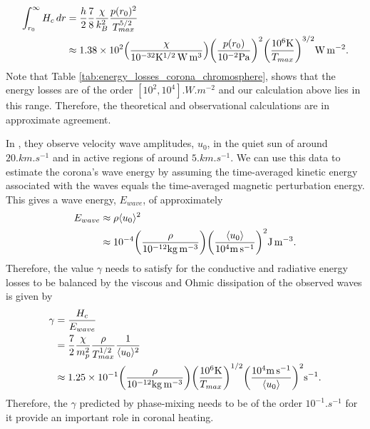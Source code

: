 \begin{equation}
    \begin{aligned}
    \int_{r_0}^\infty H_c \, dr &= \frac{h}{2}\frac{7}{8}\frac{\chi}{k_B^2}\frac{p(r_0)^2}{T_{max}^{5/2}} \\
    &\approx 1.38\times10^{2}\qty(\frac{\chi}{10^{-32}\si{.K^{1/2}.W.m^3}})\qty(\frac{p(r_0)}{10^{-2}\si{.Pa}})^2\qty(\frac{10^6\si{.K}}{T_{max}})^{3/2}\si{.W.m^{-2}}.
    \end{aligned}
\end{equation}
Note that Table \ref{tab:energy_losses_corona_chromosphere}, shows that the energy losses are of the order $[10^2,10^4]\si{.W.m^{-2}}$ and our calculation above lies in this range. Therefore, the theoretical and observational calculations are in approximate agreement. 

In \citet{McIntosh2011,McIntosh2012}, they observe velocity wave amplitudes, $u_0$, in the quiet sun of around $20\si{.km.s^{-1}}$ and in active regions of around $5\si{.km.s^{-1}}$. We can use this data to estimate the corona's wave energy by assuming the time-averaged kinetic energy associated with the waves equals the time-averaged magnetic perturbation energy. This gives a wave energy, $E_{wave}$, of approximately
\begin{equation}
    \label{eq:chap_3_observed_wave_energy}
    \begin{aligned}
    E_{wave} &\approx \rho \langle u_0 \rangle^2 \\
    &\approx10^{-4}\qty(\frac{\rho}{10^{-12}\si{.kg.m^{-3}}}) \qty(\frac{\langle u_0 \rangle}{10^4 \si{.m.s^{-1}}})^2\si{.J.m^{-3}}.
    \end{aligned}
\end{equation}
Therefore, the value $\gamma$ needs to satisfy for the conductive and radiative energy losses to be balanced by the viscous and Ohmic dissipation of the observed waves is given by
\begin{equation}
\label{eq:required_gamma}
\begin{aligned}
    \gamma &= \frac{H_c}{E_{wave}} \\
    &= \frac{7}{2}\frac{\chi}{m_p^2}\frac{\rho}{T_{max}^{1/2}}\frac{1}{\langle u_0\rangle^2} \\
    &\approx1.25\times10^{-1}\qty(\frac{\rho}{10^{-12}\si{.kg.m^{-3}}})\qty(\frac{10^6\si{.K}}{T_{max}})^{1/2}\qty(\frac{10^{4}\si{.m.s^{-1}}}{\langle u_0 \rangle})^2\si{.s^{-1}}.
\end{aligned}
\end{equation}
Therefore, the $\gamma$ predicted by phase-mixing needs to be of the order $10^{-1}\si{.s^{-1}}$ for it provide an important role in coronal heating.

